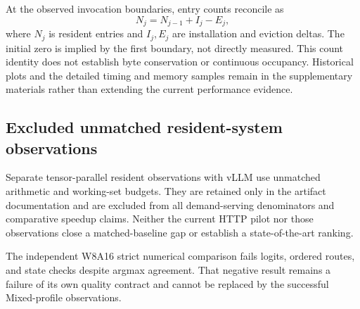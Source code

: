 At the observed invocation boundaries, entry counts reconcile as
\begin{equation}
 N_j=N_{j-1}+I_j-E_j,
 \label{eq:entry-reconciliation}
\end{equation}
where $N_j$ is resident entries and $I_j,E_j$ are installation and eviction
deltas. The initial zero is implied by the first boundary, not directly
measured. This count identity does not establish byte conservation or
continuous occupancy. Historical plots and the detailed timing and memory
samples remain in the supplementary materials rather than extending the
current performance evidence.

\subsection{Excluded unmatched resident-system observations}
\label{sec:resident-supplement}
Separate tensor-parallel resident observations with vLLM use unmatched
arithmetic and working-set budgets. They are retained only in the artifact
documentation and are excluded from all demand-serving denominators and
comparative speedup claims. Neither the current HTTP pilot nor those
observations close a matched-baseline gap or establish a state-of-the-art
ranking.

The independent W8A16 strict numerical comparison fails logits, ordered
routes, and state checks despite argmax agreement. That negative result
remains a failure of its own quality contract and cannot be replaced by the
successful Mixed-profile observations.
